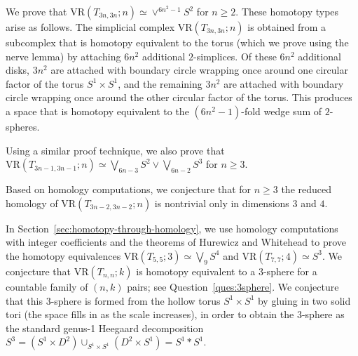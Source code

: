 \documentclass[12pt,a4paper]{amsart}
\theoremstyle{definition}
\newcommand{\vr}[2]{\mathrm{VR}(#1;#2)}
\numberwithin{equation}{section}
\begin{document}
We prove that $\vr{T_{3n,3n}}{n}\simeq\vee^{6n^2-1}S^2$ for $n\ge 2$.
These homotopy types arise as follows.
The simplicial complex $\vr{T_{3n,3n}}{n}$ is obtained from a subcomplex that is homotopy equivalent to the torus (which we prove using the nerve lemma) by attaching $6n^2$ additional $2$-simplices.
Of these $6n^2$ additional disks, $3n^2$ are attached with boundary circle wrapping once around one circular factor of the torus $S^1\times S^1$, and the remaining $3n^2$ are attached with boundary circle wrapping once around the other circular factor of the torus.
This produces a space that is homotopy equivalent to the $(6n^2-1)$-fold wedge sum of $2$-spheres.

Using a similar proof technique, we also prove that $\vr{T_{3n-1,3n-1}}{n}\simeq \bigvee_{6n-3} S^2\vee \bigvee_{6n-2}S^3$ for $n\geq 3$.

Based on homology computations, we conjecture that for $n\ge 3$ the reduced homology of $\vr{T_{3n-2,3n-2}}{n}$ is nontrivial only in dimensions $3$ and $4$.

In Section~\ref{sec:homotopy-through-homology}, we use homology computations with integer coefficients and the theorems of Hurewicz and Whitehead to prove the homotopy equivalences $\vr{T_{5,5}}{3}\simeq \bigvee_9 S^4$ and $\vr{T_{7,7}}{4}\simeq S^3$.
We conjecture that $\vr{T_{n,n}}{k}$ is homotopy equivalent to a $3$-sphere for a countable family of $(n,k)$ pairs; see Question~\ref{ques:3sphere}.
We conjecture that this 3-sphere is formed from the hollow torus $S^1 \times S^1$ by gluing in two solid tori (the space fills in as the scale increases), in order to obtain the $3$-sphere as the standard genus-1 Heegaard decomposition $S^3=(S^1\times D^2)\cup_{S^1\times S^1}(D^2 \times S^1)=S^1 * S^1$.
\end{document}
